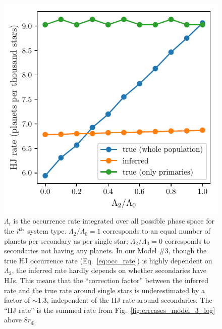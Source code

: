 \begin{figure}[!tb]
    \centering
    \includegraphics[width=.9\textwidth]{figures/HJ_correction_inputrate_vs_HJratevalues.pdf}
    \caption{
    $\Lambda_i$ is the occurrence rate integrated over all possible phase 
    space for the $i^{\rm th}$ system type. $\Lambda_2/\Lambda_0=1$ 
    corresponds to an equal number of planets per secondary as per single star;
    $\Lambda_2/\Lambda_0=0$ corresponds to secondaries not having any planets.
    In our Model \#3, though the true HJ occurrence rate 
    (Eq.~\ref{eq:occ_rate}) is highly dependent on $\Lambda_2$, 
    the inferred rate hardly depends on whether secondaries have HJs.
    This means that the ``correction factor'' between the inferred rate and 
    the true rate around single stars is underestimated by a factor of 
    $\sim1.3$, independent of the HJ rate around secondaries.
    The ``HJ rate'' is the summed rate from     
    Fig.~\ref{fig:errcases_model_3_log} above $8r_\oplus$.
    }
    \label{fig:HJ_correction_inputrate_vs_HJratevalues}
\end{figure}

